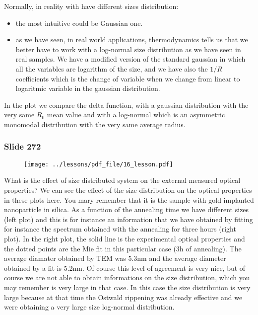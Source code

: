 \documentclass[../main/main.tex]{subfiles}
\begin{document}
Normally, in reality with have different sizes distribution:
\begin{itemize}
\item the most intuitive could be Gaussian one.
\item as we have seen, in real world applications, thermodynamics tells us that we better have to work with a log-normal size distribution as we have seen in real samples. We have a modified version of the standard gaussian in which all the variables are logarithm of the size, and we have also the \( 1/R \) coefficients which is the change of variable when we change from linear to logaritmic variable in the gaussian distribution.
\end{itemize}
In the plot we compare the delta function, with a gaussian distribution with the very same \( R_0 \) mean value and with a log-normal which is an asymmetric monomodal distribution with the very same average radius.


\newpage

\subsubsection{Slide 272}

\begin{figure}[h!]
\centering
\texttt{[image: ../lessons/pdf\_file/16\_lesson.pdf]}
\end{figure}

What is the effect of size distributed system on the external measured optical properties?
We can see the effect of the size distribution on the optical properties in these plots here.
You mary remember that it is the sample with gold implanted nanoparticle in silica. As a function of the annealing time we have different sizes (left plot) and this is for instance an information that we have obtained by fitting for instance the spectrum obtained with the annealing for three hours (right plot). In the right plot, the solid line is the experimental optical properties and the dotted points are the Mie fit in this particular case (3h of annealing). The average diamater obtained by TEM was 5.3nm and the average diameter obtained by a fit is 5.2nm. Of course this level of agreement is very nice, but of course we are not able to obtain informations on the size distribution, which you may remember is very large in that case. In this case the size distribution is very large because at that time the Ostwald rippening was already effective and we were obtaining a very large size log-normal distribution.
\end{document}

